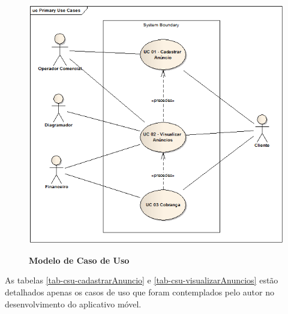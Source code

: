 \documentclass[
	12pt,				%
	openright,			%
	oneside,			%
	a4paper,			%
	chapter=TITLE,		%
	section=TITLE,		%
	english,			%
	french,				%
	spanish,			%
	brazil				%
	]{abntex2}
\begin{document}
\begin{figure}[h]
	\begin{center}
		\caption{
			\textbf{Modelo de Caso de Uso}
		}\label{fig-modelo-uc}
		\includegraphics [scale=0.6]{imagens/modelo_caso_de_uso.png}
		\label{fig-modelo-uc}
	\end{center}
\end{figure}

As tabelas \ref{tab-csu-cadastrarAnuncio} e \ref{tab-csu-visualizarAnuncios} estão detalhados apenas os casos de uso que foram contemplados pelo autor no desenvolvimento do aplicativo móvel. \\ \\ \\ \\ \\ \\ \\ \\ \\ \\ \\ \\ \\ \\ \\
\end{document}
